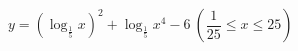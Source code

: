 $y=\left(\log_{\frac{1}{5}} x\right)^{2}+\log_{\frac{1}{5}} x^4-6\ \left(\dfrac{1}{25}\le x\le 25\right)$
